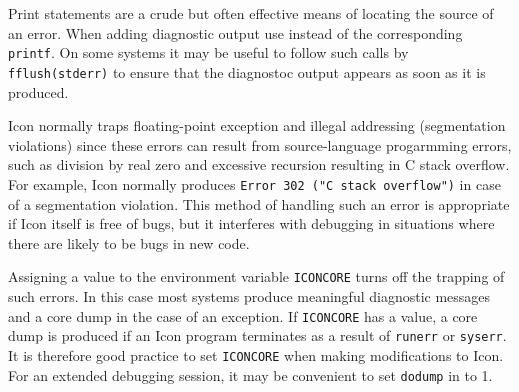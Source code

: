 Print statements are a crude but often effective means of locating the source of
an error. When adding diagnostic output use
\noindent
instead of the corresponding \texttt{printf}. On some systems it may be useful
to follow such calls by \texttt{fflush(stderr)} to ensure that the diagnostoc
output appears as soon as it is produced.

Icon normally traps floating-point exception and illegal addressing
(segmentation violations) since these errors can result from source-language
progarmming errors, such as division by real zero and excessive recursion
resulting in C stack overflow. For example, Icon normally produces
\texttt{Error 302 ("C stack overflow")} in case of a segmentation violation.
This method of handling such an error is appropriate if Icon itself is free of
bugs, but it interferes with debugging in situations where there are likely to
be bugs in new code.

Assigning a value to the environment variable \texttt{ICONCORE} turns off the
trapping of such errors. In this case most systems produce meaningful diagnostic
messages and a core dump in the case of an exception.  If \texttt{ICONCORE} has
a value, a core dump is produced if an Icon program terminates as a result of
\texttt{runerr} or \texttt{syserr}.  It is therefore good practice to set
\texttt{ICONCORE} when making modifications to Icon. For an extended debugging
session, it may be convenient to set \texttt{dodump} in  to 1.

\clearpage
\bigskip
